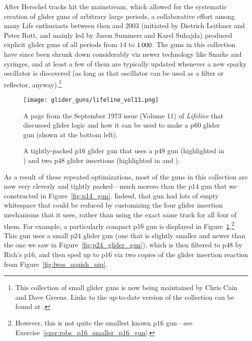 After Herschel tracks hit the mainstream, which allowed for the systematic creation of glider guns of arbitrary large periods, a collaborative effort among many Life enthusiasts between then and 2003 (initiated by Dietrich Leithner and Peter Rott, and mainly led by Jason Summers and Karel Suhajda) produced explicit glider guns of all periods from $14$ to $1{\,}000$. The guns in this collection have since been shrunk down considerably via newer technology like Snarks and syringes, and at least a few of them are typically updated whenever a new sparky oscillator is discovered (as long as that oscillator can be used as a filter or reflector, anyway).\footnote{This collection of small glider guns is now being maintained by Chris Cain and Dave Greene. Links to the up-to-date version of the collection can be found at .}

\begin{figure}[!htb]
	\centering
	\begin{minipage}[b]{0.46\textwidth}
		\centering
		\texttt{[image: glider\_guns/lifeline\_vol11.png]}
		\caption{A page from the September 1973 issue (Volume 11) of \emph{Lifeline} that discussed glider logic and how it can be used to make a p$60$ glider gun (shown at the bottom left).}\label{fig:lifeline_v11}
	\end{minipage}\hfill
	\begin{minipage}[b]{0.5\textwidth}
		\centering
		\caption{A tightly-packed p$16$ glider gun that uses a p$48$ gun (highlighted in ) and two p$48$ glider insertions (highlighted in  and ).}\label{fig:p16_gun}
	\end{minipage}
\end{figure}

As a result of these repeated optimizations, most of the guns in this collection are now very cleverly and tightly packed---much moreso than the p$14$ gun that we constructed in Figure~\ref{fig:p14_gun}. Indeed, that gun had lots of empty whitespace that could be reduced by customizing the four glider insertion mechanisms that it uses, rather than using the exact same track for all four of them. For example, a particularly compact p$16$ gun is displayed in Figure~\ref{fig:p16_gun}.\footnote{However, this is not quite the smallest known p$16$ gun---see Exercise~\ref{exer:robs_p16_smaller_p16_gun}.} This gun uses a small p$24$ glider gun (one that is slightly smaller and newer than the one we saw in Figure~\ref{fig:p24_glider_gun}), which is then filtered to p$48$ by Rich's p$16$, and then sped up to p$16$ via two copies of the glider insertion reaction from Figure~\ref{fig:lwss_squish_pip}.

